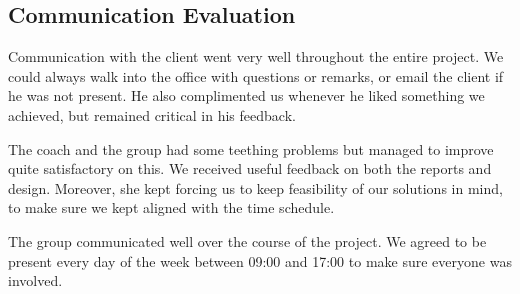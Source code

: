 \subsection{Communication Evaluation}
Communication with the client went very well throughout the entire project. We could always walk into the office with questions or remarks, or email the client if he was not present. He also complimented us whenever he liked something we achieved, but remained critical in his feedback.

The coach and the group had some teething problems but managed to improve quite satisfactory on this. We received useful feedback on both the reports and design. Moreover, she kept forcing us to keep feasibility of our solutions in mind, to make sure we kept aligned with the time schedule.

The group communicated well over the course of the project. We agreed to be present every day of the week between 09:00 and 17:00 to make sure everyone was involved.